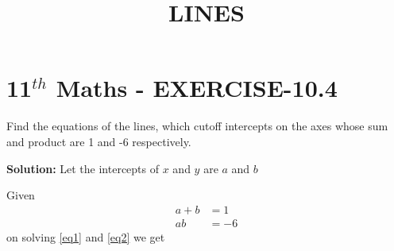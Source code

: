 \documentclass[10pt]{article}
\newcommand{\solution}{\noindent \textbf{Solution: }}
\begin{document}
\begin{center}
\title{\textbf{LINES}}
\date{\vspace{-5ex}} %
\maketitle
\end{center}

\section*{11$^{th}$ Maths - EXERCISE-10.4}

Find the  equations of the lines, which cutoff intercepts on the axes  whose sum and product are 1 and -6 respectively.

\solution
Let the intercepts of $x$ and $y$ are $a$ and $b$\\

\begin{table}[!h]
\centering

\caption{}
\label{Inputs}
\end{table}
Given
\begin{align}
a+b&=1
\label{eq1}\\
ab&=-6
\label{eq2}
\end{align} 
on solving \eqref{eq1} and \eqref{eq2} we get\\
\end{document}
